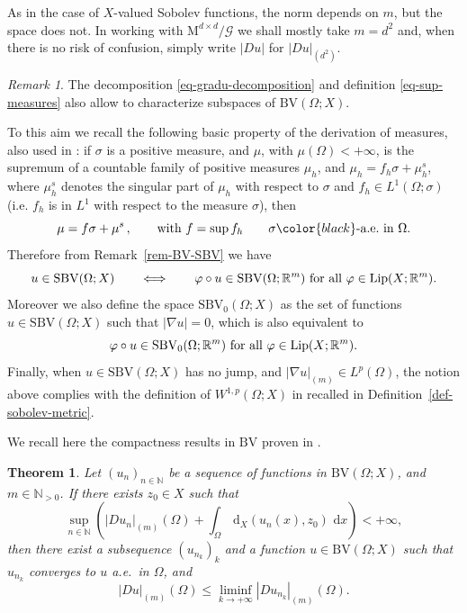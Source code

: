 \documentclass[a4paper,reqno]{amsart}
\newcommand\R{\mathbb{R}}
\newcommand\N{\mathbb{N}}
\newcommand{\BV}{\mathrm{BV}}
\newcommand{\SBV}{\mathrm{SBV}}
\newcommand\dix{{\,\mathrm{d}_X}}
\newtheorem{theorem}[definition]{Theorem}
\theoremstyle{remark}
\newtheorem{remark}[definition]{Remark}
\newcommand{\EEE}{\color{black}}
\newcommand\dx{{\,\mathrm{d}x}}
\newcommand{\G}{\mathcal{G}}
\newcommand{\Mno}{\mathrm{M}^{d\times d}}
\newcommand{\Lip}{\mathrm{Lip}}
\numberwithin{equation}{section}
\begin{document}
As in the case of $X$-valued Sobolev functions, the norm depends on $m$, but the space does not. In working with $\Mno/\G$ we shall mostly take $m=d^2$ and, when there is no risk of confusion, simply write $|Du|$ for $|Du|_{(d^2)}$.

	\begin{remark}
		\label{rem-SVB0-Sob}
	The decomposition \eqref{eq-gradu-decomposition} and definition \eqref{eq-sup-measures} also  allow to characterize subspaces of $\BV(\Omega;X)$.
	
	To this aim we recall the following basic property of the derivation of measures, also used in \cite{Amb90SBVX}:  if $\sigma$ is a positive measure, and $\mu$, with $\mu(\Omega)<+\infty$, is the supremum of a countable family of positive measures $\mu_h$, and $\mu_h=f_h\sigma +\mu_h^s$,  where $\mu_h^s$ denotes the singular part of $\mu_h$ with respect to $\sigma$ and $f_h\in L^1(\Omega;\sigma)$  (i.e. $f_h$ is in $L^1$ with respect to the measure $\sigma$),  then
	\begin{equation}
		\label{eq-decompos-measure}
		\mu=f\sigma +\mu^s\,,\qquad  \hbox{with } f=\sup f_h\qquad \sigma\EEE\hbox{-a.e.\ in } \Omega. 
	\end{equation}
	Therefore from  Remark~\ref{rem-BV-SBV}  we have
	\begin{equation}
		\label{eq-lip-SVB}
		u\in \SBV(\Omega;X)\qquad \Longleftrightarrow \qquad  \varphi\circ u\in \SBV(\Omega;\R^m)\ \hbox{for all } \varphi\in \Lip(X;\R^m).
	\end{equation}
	Moreover we also define the space  $\SBV_0(\Omega;X)$ as the set of functions $u\in \SBV(\Omega;X)$ such that $|\nabla u|=0$, which is also equivalent to
	\begin{equation}
		\label{eq-lip-SVB0}
	\varphi 	\circ u\in \SBV_0(\Omega;\R^m)\ \hbox{for all } \varphi\in \Lip(X;\R^m).
	\end{equation}
	Finally, when $u \in \SBV(\Omega; X)$ has no jump, and  $|\nabla u|_{(m)} \in L^p(\Omega)$, the notion above complies with the definition of $W^{1,p}(\Omega; X)$ in \cite{Resh} recalled in Definition~\ref{def-sobolev-metric}.
\end{remark}

We recall here the compactness results in $\BV$  proven in \cite[Theorem 2.4]{Amb90SBVX}.

\begin{theorem}\label{t:BVXcomp}
	Let $(u_n)_{n\in\N}$ be a sequence of functions in $\BV(\Omega;X)$, and $m\in\N_{>0}$.
	If there exists $z_0\in X$ such that
	\[
	\sup_{n\in\N} \left( |Du_n|_{(m)}(\Omega)+\int_\Omega \dix(u_n(x),z_0)\, \dx \right)<+\infty,
	\]
	then there exist a subsequence $(u_{n_k})_k$ and a function $u\in \BV(\Omega;X)$ such that
	$u_{n_k}$ converges to $u$ a.e.\ in $\Omega$, and
	\[
	|Du|_{(m)}(\Omega) \leq \liminf_{k \to+\infty}  |Du_{n_k}|_{(m)}(\Omega).
	\]
\end{theorem}
\end{document}
